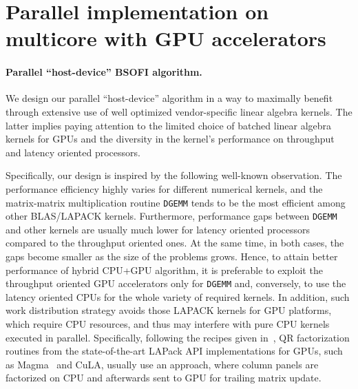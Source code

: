 \documentclass{llncs}
\newcommand{\Lapack}{{\sc LAPack}\xspace}
\newcommand{\Magma}{{\sc Magma}\xspace}
\newcommand{\Cula}{{\sc CuLA}\xspace}
\begin{document}
\section{Parallel implementation on multicore with GPU accelerators}
\label{sec:implementation_on_CPU+GPU}

\paragraph%
    {Parallel ``host-device'' BSOFI algorithm.}\label{sec:alrorithms_for_accelerators}

    We design our parallel ``host-device'' algorithm in a way to maximally benefit 
    through extensive use of well optimized vendor-specific 
    linear algebra kernels.
    The latter implies paying attention to 
    the limited choice of batched linear algebra kernels for GPUs
    and the diversity in the kernel's performance on throughput and latency oriented processors.

    Specifically, our design is inspired by the following well-known observation.
    The performance efficiency
    highly varies for different numerical kernels, 
    and the matrix-matrix multiplication routine {\tt DGEMM}
    tends to be the most efficient among other BLAS/LAPACK kernels. 
    Furthermore, performance gaps between {\tt DGEMM} and other kernels
    are usually much lower for 
    latency oriented processors compared to the throughput oriented ones.
    At the same time, in both cases, the gaps become smaller 
    as the size of the problems grows.
    Hence, 
    to attain better performance of hybrid CPU+GPU algorithm, 
    it is preferable to exploit 
    the throughput oriented GPU accelerators only for {\tt DGEMM}
    and, conversely, 
    to use the latency oriented CPUs for the whole variety of required kernels.
    In addition, such work distribution strategy
    avoids those LAPACK kernels for GPU platforms,
    which require CPU resources, 
    and thus may 
    interfere with pure CPU kernels
    executed in parallel.
    Specifically, %
    following the recipes given in~\cite{Volkov08LU_QR_Cholesky},
    QR factorization routines 
    from the state-of-the-art \Lapack API implementations for GPUs,
    such as \Magma~\cite{Tomov10Magma} and
    \Cula,
    usually use an approach, 
    where column panels are factorized on CPU 
    and afterwards sent to GPU for trailing matrix update.
\end{document}
